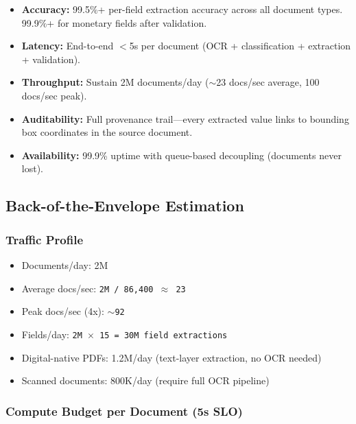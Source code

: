 \begin{itemize}
  \item \textbf{Accuracy:} 99.5\%+ per-field extraction accuracy across all document types. 99.9\%+ for monetary fields after validation.
  \item \textbf{Latency:} End-to-end $<$5s per document (OCR + classification + extraction + validation).
  \item \textbf{Throughput:} Sustain 2M documents/day ($\sim$23 docs/sec average, 100 docs/sec peak).
  \item \textbf{Auditability:} Full provenance trail---every extracted value links to bounding box coordinates in the source document.
  \item \textbf{Availability:} 99.9\% uptime with queue-based decoupling (documents never lost).
\end{itemize}

\subsection*{Back-of-the-Envelope Estimation}

\subsubsection*{Traffic Profile}

\begin{itemize}
  \item Documents/day: 2M
  \item Average docs/sec: \texttt{2M / 86,400 $\approx$ 23}
  \item Peak docs/sec (4x): \texttt{$\sim$92}
  \item Fields/day: \texttt{2M $\times$ 15 = 30M field extractions}
  \item Digital-native PDFs: 1.2M/day (text-layer extraction, no OCR needed)
  \item Scanned documents: 800K/day (require full OCR pipeline)
\end{itemize}

\subsubsection*{Compute Budget per Document (5s SLO)}

